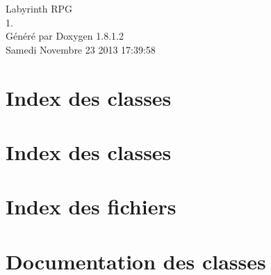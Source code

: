 \documentclass{book}
\begin{document}
\begin{titlepage}
\vspace*{7cm}
\begin{center}
{\Large Labyrinth R\-P\-G \\[1ex]\large 1. }\\
\vspace*{1cm}
{\large Généré par Doxygen 1.8.1.2}\\
\vspace*{0.5cm}
{\small Samedi Novembre 23 2013 17:39:58}\\
\end{center}
\end{titlepage}
\clearemptydoublepage
{}
\tableofcontents
\clearemptydoublepage
{}
\chapter{Index des classes}

\chapter{Index des classes}

\chapter{Index des fichiers}

\chapter{Documentation des classes}



























































\end{document}
